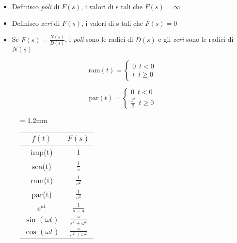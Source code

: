 	\begin{itemize}
		\item Definisco \emph{poli} di $ F(s) $, i valori di s tali che $ F(s) = \infty $
		\item Definisco \emph{zeri} di $ F(s) $, i valori di s tali che $ F(s) = 0 $
		\item Se $ F(s) = \frac{N(s)}{D(s)} $, i \emph{poli} sono le radici di $ D(s) $ e gli \emph{zeri} sono le radici di $ N(s) $
	\end{itemize}
	\begin{figure}[H]
		\begin{minipage}{0.3\linewidth}
			\centering
			\begin{equation*}
				\text{ram}(t)=\begin{cases}
					0 \,\,\, t<0\\
					t \,\,\, t\geq0
				\end{cases}
			\end{equation*}
		\end{minipage}%
		\begin{minipage}{0.3\linewidth}
			\centering
			\begin{equation*}
				\text{par}(t)=\begin{cases}
					0\,\,\, t<0\\
					\frac{t^2}{2}\,\,\, t\geq0
				\end{cases}
			\end{equation*}
		\end{minipage}
		\begin{minipage}{0.3\linewidth}
			{\tabulinesep = 1.2mm
				\begin{tabu}[H]{|c|c|}
					\hline
					$ f(t) $&$ F(s) $ \\
					\hline
					
					\Large imp(t) & $ 1 $\\\hline
					\Large sca(t) & \Large$ \frac{1}{s} $\\\hline
					\Large ram(t) & \Large$\frac{1}{s^2}$\\\hline
					\Large par(t) & \Large$ \frac{1}{s^3} $\\\hline
					\Large $ e^{at} $ & \Large$ \frac{1}{s-a} $\\\hline
					\Large $ \sin(\omega t) $ &\Large $\frac{\omega}{s^2 + \omega^2}$\\\hline
					\Large $ \cos(\omega t) $ &\Large $ \frac{s}{s^2 + \omega^2} $\\\hline
			\end{tabu}}
		\end{minipage}
	\end{figure}
